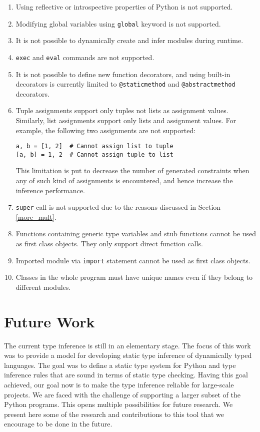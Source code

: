 \begin{enumerate}
\item Using reflective or introspective properties of Python is not supported.
\item Modifying global variables using \lstinline|global| keyword is not supported.
\item It is not possible to dynamically create and infer modules during runtime.
\item \lstinline|exec| and \lstinline|eval| commands are not supported.
\item It is not possible to define new function decorators, and using built-in decorators is currently limited to \lstinline|@staticmethod| and \lstinline|@abstractmethod| decorators.
\item Tuple assignments support only tuples not lists as assignment values. Similarly, list assignments support only lists and assignment values. For example, the following two assignments are not supported:
\begin{lstlisting}
a, b = [1, 2]  # Cannot assign list to tuple
[a, b] = 1, 2  # Cannot assign tuple to list
\end{lstlisting}
This limitation is put to decrease the number of generated constraints when any of such kind of assignments is encountered, and hence increase the inference performance.

\item \lstinline|super| call is not supported due to the reasons discussed in Section \ref{more_mult}.

\item Functions containing generic type variables and stub functions cannot be used as first class objects. They only support direct function calls.
\item Imported module via \lstinline|import| statement cannot be used as first class objects.

\item Classes in the whole program must have unique names even if they belong to different modules.
\end{enumerate}

\section{Future Work}
The current type inference is still in an elementary stage. The focus of this work was to provide a model for developing static type inference of dynamically typed languages. The goal was to define a static type system for Python and type inference rules that are sound in terms of static type checking. Having this goal achieved, our goal now is to make the type inference reliable for large-scale projects. We are faced with the challenge of supporting a larger subset of the Python programs. This opens multiple possibilities for future research. We present here some of the research and contributions to this tool that we encourage to be done in the future.

